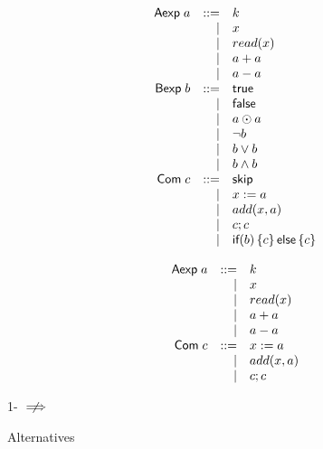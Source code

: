 \documentclass[xcolor={dvipsnames,svgnames,table}]{beamer}
\begin{document}
\begin{frame}{\imp{}}
  \footnotesize
  \[
    \begin{array}{rrl}
      \textsf{Aexp}\;
        a & ::= & k       \\
          & |   & x       \\
          & |   & read(x) \\
          & |   & a + a   \\
          & |   & a - a   \\
      \textsf{Bexp}\;
        b & ::= & \textsf{true}  \\
          & |   & \textsf{false} \\
          & |   & a \odot a      \\
          & |   & \lnot b        \\
          & |   & b \lor b       \\
          & |   & b \land b      \\
      \textsf{Com}\;
        c  & ::= & \textsf{skip}        \\
           & |   & x := a          \\
           & |   & add(x, a)       \\
           & |   & c; c            \\
           & |   & \textsf{if}(b)\left\{c\right\}\textsf{else}\left\{c\right\} \\
    \end{array}
  \]
\end{frame}

\begin{frame}{\wimp{}}
  \[
    \begin{array}{rrl}
      \textsf{Aexp}\;
        a & ::= & k       \\
          & |   & x       \\
          & |   & read(x) \\
          & |   & a + a   \\
          & |   & a - a   \\
      \textsf{Com}\;
        c  & ::= & x := a    \\
           & |   & add(x, a) \\
           & |   & c; c      \\
    \end{array}
  \]
\end{frame}

\begin{frame}
  \begin{center}
    \huge
    1-\iconfluence{} $\centernot\implies$ \iconfluence
  \end{center}
\end{frame}

\begin{frame}{\iconfluence{} Alternatives}
\end{frame}
\end{document}

